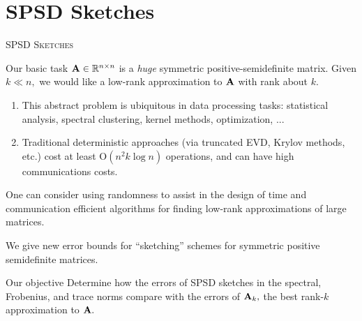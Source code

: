 \documentclass[xcolor=x11names,compress,ignorenonframetext,10pt]{beamer}
\renewcommand{\(}{\begin{columns}}
\renewcommand{\)}{\end{columns}}
\newcommand{\<}[1]{\begin{column}{#1}}
\renewcommand{\>}{\end{column}}
\begin{document}
\section{SPSD Sketches}

\begin{frame}
\vfill
\begin{beamercolorbox}[center]{}
\Large \textsc{SPSD Sketches}
\end{beamercolorbox}
\vfill
\end{frame}

\begin{frame}
 \begin{block}{Our basic task}
   $\mathbf{A} \in \mathbb{R}^{n \times n}$ is a \emph{huge} symmetric positive-semidefinite matrix. Given $k \ll n,$ we
  would like a low-rank approximation to $\mathbf{A}$ with rank about $k$.
 \end{block}

 \begin{enumerate}
  \item This abstract problem is ubiquitous in data processing tasks: statistical analysis, spectral clustering,
  kernel methods, optimization, ...
\item Traditional deterministic approaches (via truncated EVD, Krylov methods, etc.)
  cost at least $\mathrm{O}(n^2 k\log n)$ operations, and can have high communications costs.
 \end{enumerate}

\end{frame}

\begin{frame}
 One can consider using randomness to assist in the design of time and communication efficient algorithms
 for finding low-rank approximations of large matrices. 
 \vspace{0.7em}
 
 We give new error bounds for 
 ``sketching'' schemes for symmetric positive semidefinite matrices.
 
\begin{block}{Our objective}
 Determine how the errors of SPSD sketches in the spectral, Frobenius, and trace norms compare with the errors of $\mathbf{A}_k,$ the 
 best rank-$k$ approximation to $\mathbf{A}.$
\end{block}

\end{frame}
\end{document}
